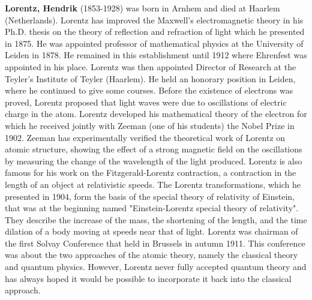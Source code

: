 \textbf{Lorentz, Hendrik} (1853-1928) was born in Arnhem and died at Haarlem (Netherlands). Lorentz has improved the Maxwell's electromagnetic theory in his Ph.D. thesis on the theory of reflection and refraction of light which he presented in 1875. He was appointed professor of mathematical physics at the University of Leiden in 1878. He remained in this establishment until 1912 where Ehrenfest was appointed in his place. Lorentz was then appointed Director of Research at the Teyler's Institute of Teyler (Haarlem). He held an honorary position in Leiden, where he continued to give some courses. Before the existence of electrons was proved, Lorentz proposed that light waves were due to oscillations of electric charge in the atom. Lorentz developed his mathematical theory of the electron for which he received jointly with Zeeman (one of his students) the Nobel Prize in 1902.  Zeeman has experimentally verified the theoretical work of Lorentz on atomic structure, showing the effect of a strong magnetic field on the oscillations by measuring the change of the wavelength of the light produced. Lorentz is also famous for his work on the Fitzgerald-Lorentz contraction, a contraction in the length of an object at relativistic speeds. The Lorentz transformations, which he presented in 1904, form the basis of the special theory of relativity of Einstein, that was at the beginning named "Einstein-Lorentz special theory of relativity". They describe the increase of the mass, the shortening of the length, and the time dilation of a body moving at speeds near that of light. Lorentz was chairman of the first Solvay Conference that held in Brussels in autumn 1911. This conference was about the two approaches of the atomic theory, namely the classical theory and quantum physics. However, Lorentz never fully accepted quantum theory and has always hoped it would be possible to incorporate it back into the classical approach.

